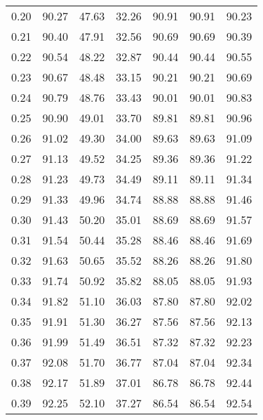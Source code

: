 \begin{tabular}{|c|c|c|c|c|c|c|}
      0.20 &     90.27 &     47.63 &      32.26 &   90.91 &      90.91 &         90.23 \\
      0.21 &     90.40 &     47.91 &      32.56 &   90.69 &      90.69 &         90.39 \\
      0.22 &     90.54 &     48.22 &      32.87 &   90.44 &      90.44 &         90.55 \\
      0.23 &     90.67 &     48.48 &      33.15 &   90.21 &      90.21 &         90.69 \\
      0.24 &     90.79 &     48.76 &      33.43 &   90.01 &      90.01 &         90.83 \\
      0.25 &     90.90 &     49.01 &      33.70 &   89.81 &      89.81 &         90.96 \\
      0.26 &     91.02 &     49.30 &      34.00 &   89.63 &      89.63 &         91.09 \\
      0.27 &     91.13 &     49.52 &      34.25 &   89.36 &      89.36 &         91.22 \\
      0.28 &     91.23 &     49.73 &      34.49 &   89.11 &      89.11 &         91.34 \\
      0.29 &     91.33 &     49.96 &      34.74 &   88.88 &      88.88 &         91.46 \\
      0.30 &     91.43 &     50.20 &      35.01 &   88.69 &      88.69 &         91.57 \\
      0.31 &     91.54 &     50.44 &      35.28 &   88.46 &      88.46 &         91.69 \\
      0.32 &     91.63 &     50.65 &      35.52 &   88.26 &      88.26 &         91.80 \\
      0.33 &     91.74 &     50.92 &      35.82 &   88.05 &      88.05 &         91.93 \\
      0.34 &     91.82 &     51.10 &      36.03 &   87.80 &      87.80 &         92.02 \\
      0.35 &     91.91 &     51.30 &      36.27 &   87.56 &      87.56 &         92.13 \\
      0.36 &     91.99 &     51.49 &      36.51 &   87.32 &      87.32 &         92.23 \\
      0.37 &     92.08 &     51.70 &      36.77 &   87.04 &      87.04 &         92.34 \\
      0.38 &     92.17 &     51.89 &      37.01 &   86.78 &      86.78 &         92.44 \\
      0.39 &     92.25 &     52.10 &      37.27 &   86.54 &      86.54 &         92.54 \\

\end{tabular}
